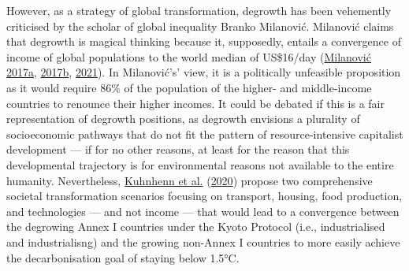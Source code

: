 \documentclass[a4paper, nobind]{templates/ociamthesis}
\begin{document}
However, as a strategy of global transformation, degrowth has been vehemently criticised by the scholar of global inequality Branko Milanović. Milanović claims that degrowth is magical thinking because it, supposedly, entails a convergence of income of global populations to the world median of US\$16/day (\protect\hyperlink{ref-milanovic_illusion_2017a}{Milanović 2017a}, \protect\hyperlink{ref-milanovic_illusion_2017}{2017b}, \protect\hyperlink{ref-milanovic_degrowth_2021}{2021}). In Milanović's' view, it is a politically unfeasible proposition as it would require 86\% of the population of the higher- and middle-income countries to renounce their higher incomes. It could be debated if this is a fair representation of degrowth positions, as degrowth envisions a plurality of socioeconomic pathways that do not fit the pattern of resource-intensive capitalist development --- if for no other reasons, at least for the reason that this developmental trajectory is for environmental reasons not available to the entire humanity. Nevertheless, \protect\hyperlink{ref-kuhnhenn_societal_2020}{Kuhnhenn et al.} (\protect\hyperlink{ref-kuhnhenn_societal_2020}{2020}) propose two comprehensive societal transformation scenarios focusing on transport, housing, food production, and technologies --- and not income --- that would lead to a convergence between the degrowing Annex I countries under the Kyoto Protocol (i.e., industrialised and industrialisng) and the growing non-Annex I countries to more easily achieve the decarbonisation goal of staying below 1.5°C.
\end{document}

